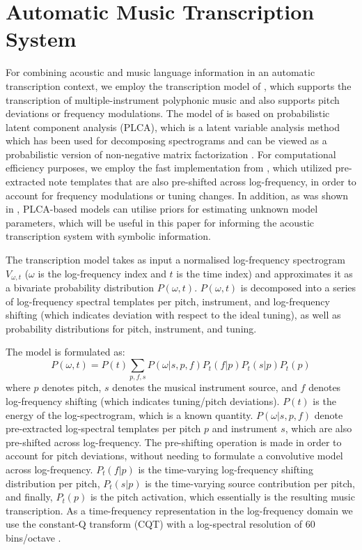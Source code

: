 \section{Automatic Music Transcription System} \label{sec:transcription}


For combining acoustic and music language information in an automatic transcription context, we employ the transcription model of \cite{Benetos2012}, which supports the transcription of multiple-instrument polyphonic music and also supports pitch deviations or frequency modulations. The model of \cite{Benetos2012} is based on probabilistic latent component analysis (PLCA), which is a latent variable analysis method which has been used for decomposing spectrograms \cite{Shashanka2008} and can be viewed as a probabilistic version of non-negative matrix factorization \cite{Li1999}. For computational efficiency purposes, we employ the fast implementation from \cite{Benetos2013}, which utilized pre-extracted note templates that are also pre-shifted across log-frequency, in order to account for frequency modulations or tuning changes. In addition, as was shown in \cite{Smaragdis2009}, PLCA-based models can utilise priors for estimating unknown model parameters, which will be useful in this paper for informing the 
acoustic transcription system with symbolic information.

The transcription model takes as input a normalised log-frequency spectrogram $V_{\omega,t}$ ($\omega$ is the log-frequency index and $t$ is the time index) and approximates it as a bivariate probability distribution $P(\omega,t)$. $P(\omega,t)$ is decomposed into a series of log-frequency spectral templates per pitch, instrument, and log-frequency shifting (which indicates deviation with respect to the ideal tuning), as well as probability distributions for pitch, instrument, and tuning. 

The model is formulated as:
\begin{equation}
P(\omega,t) = P(t)\sum_{p,f,s}P(\omega|s,p,f)P_{t}(f|p)P_{t}(s|p)P_{t}(p) \label{eq:Model}
\end{equation} 
where $p$ denotes pitch, $s$ denotes the musical instrument source, and $f$ denotes log-frequency shifting (which indicates tuning/pitch deviations). $P(t)$ is the energy of the log-spectrogram, which is a known quantity. $P(\omega|s,p,f)$ denote pre-extracted log-spectral templates per pitch $p$ and instrument $s$, which are also pre-shifted across log-frequency. The pre-shifting operation is made in order to account for pitch deviations, without needing to formulate a convolutive model across log-frequency. $P_{t}(f|p)$ is the time-varying log-frequency shifting distribution per pitch, $P_{t}(s|p)$ is the time-varying source contribution per pitch, and finally, $P_{t}(p)$ is the pitch activation, which essentially is the resulting music transcription. As a time-frequency representation in the log-frequency domain we use the constant-Q transform (CQT) with a log-spectral resolution of 60 bins/octave \cite{Schoerkhuber10}.

